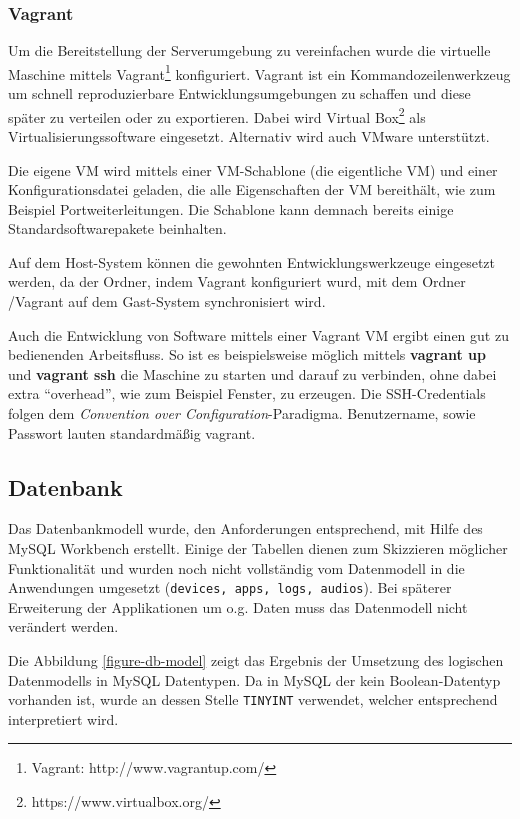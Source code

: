 \subsubsection{Vagrant \label{sec:Vagrant}}
\label{vagrant}
Um die Bereitstellung der Serverumgebung zu vereinfachen wurde die virtuelle Maschine mittels Vagrant\footnote{Vagrant: http://www.vagrantup.com/} konfiguriert. 
Vagrant ist ein Kommandozeilenwerkzeug um schnell reproduzierbare Entwicklungsumgebungen zu schaffen und diese später zu verteilen oder zu exportieren. 
Dabei wird Virtual Box\footnote{https://www.virtualbox.org/} als Virtualisierungssoftware eingesetzt. 
Alternativ wird auch VMware unterstützt. 

Die eigene \ac{VM} wird mittels einer VM-Schablone (die eigentliche VM) und einer Konfigurationsdatei geladen, die alle Eigenschaften der VM bereithält, wie zum Beispiel Portweiterleitungen. 
Die Schablone kann demnach bereits einige Standardsoftwarepakete beinhalten. 

Auf dem Host-System können die gewohnten Entwicklungswerkzeuge eingesetzt werden, da der Ordner, indem Vagrant konfiguriert wurd, mit dem Ordner /Vagrant auf dem Gast-System synchronisiert wird. 

Auch die Entwicklung von Software mittels einer Vagrant VM ergibt einen gut zu bedienenden Arbeitsfluss. 
So ist es beispielsweise möglich mittels \textbf{vagrant up} und \textbf{vagrant ssh} die Maschine zu starten und darauf zu verbinden, ohne dabei extra \enquote{overhead}, wie zum Beispiel Fenster, zu erzeugen. 
Die SSH-Credentials folgen dem \textit{Convention over Configuration}-Paradigma. 
Benutzername, sowie Passwort lauten standardmäßig vagrant. 

\subsection{Datenbank}

Das Datenbankmodell wurde, den Anforderungen entsprechend, mit Hilfe des MySQL Workbench erstellt.
Einige der Tabellen dienen zum Skizzieren möglicher Funktionalität und wurden noch nicht vollständig vom Datenmodell in die Anwendungen umgesetzt (\texttt{devices, apps, logs, audios}).
Bei späterer Erweiterung der Applikationen um o.g. Daten muss das Datenmodell nicht verändert werden.

Die Abbildung \ref{figure-db-model} zeigt das Ergebnis der Umsetzung des logischen Datenmodells in MySQL Datentypen.
Da in MySQL der kein Boolean-Datentyp vorhanden ist, wurde an dessen Stelle \texttt{TINYINT} verwendet, welcher entsprechend interpretiert wird.

